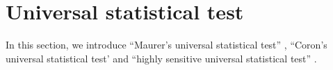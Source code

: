 \documentclass[dvipdfmx,english]{ampmt} %
\begin{document}
%
\newpage
\section{Universal statistical test}\label{sec:universal}
In this section, we introduce ``Maurer's universal statistical test'' \cite{maurer1992universal}, ``Coron's universal statistical test' \cite{coron1999security} and ``highly sensitive universal statistical test'' \cite{yamamoto2016highly}.
%

\newpage
\end{document}
